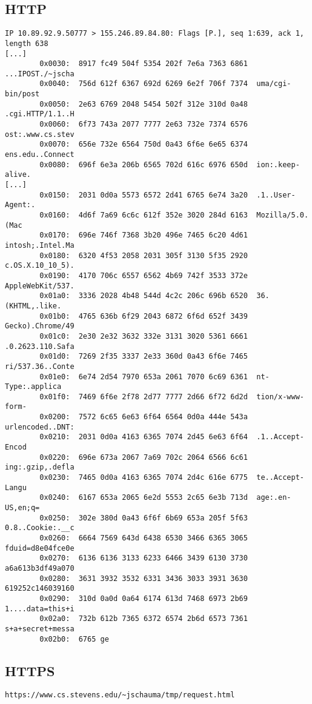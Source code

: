 \documentclass[xga]{xdvislides}
\begin{document}
\subsection{HTTP}
\small
\begin{verbatim}
IP 10.89.92.9.50777 > 155.246.89.84.80: Flags [P.], seq 1:639, ack 1, length 638
[...]
        0x0030:  8917 fc49 504f 5354 202f 7e6a 7363 6861  ...IPOST./~jscha
        0x0040:  756d 612f 6367 692d 6269 6e2f 706f 7374  uma/cgi-bin/post
        0x0050:  2e63 6769 2048 5454 502f 312e 310d 0a48  .cgi.HTTP/1.1..H
        0x0060:  6f73 743a 2077 7777 2e63 732e 7374 6576  ost:.www.cs.stev
        0x0070:  656e 732e 6564 750d 0a43 6f6e 6e65 6374  ens.edu..Connect
        0x0080:  696f 6e3a 206b 6565 702d 616c 6976 650d  ion:.keep-alive.
[...]
        0x0150:  2031 0d0a 5573 6572 2d41 6765 6e74 3a20  .1..User-Agent:.
        0x0160:  4d6f 7a69 6c6c 612f 352e 3020 284d 6163  Mozilla/5.0.(Mac
        0x0170:  696e 746f 7368 3b20 496e 7465 6c20 4d61  intosh;.Intel.Ma
        0x0180:  6320 4f53 2058 2031 305f 3130 5f35 2920  c.OS.X.10_10_5).
        0x0190:  4170 706c 6557 6562 4b69 742f 3533 372e  AppleWebKit/537.
        0x01a0:  3336 2028 4b48 544d 4c2c 206c 696b 6520  36.(KHTML,.like.
        0x01b0:  4765 636b 6f29 2043 6872 6f6d 652f 3439  Gecko).Chrome/49
        0x01c0:  2e30 2e32 3632 332e 3131 3020 5361 6661  .0.2623.110.Safa
        0x01d0:  7269 2f35 3337 2e33 360d 0a43 6f6e 7465  ri/537.36..Conte
        0x01e0:  6e74 2d54 7970 653a 2061 7070 6c69 6361  nt-Type:.applica
        0x01f0:  7469 6f6e 2f78 2d77 7777 2d66 6f72 6d2d  tion/x-www-form-
        0x0200:  7572 6c65 6e63 6f64 6564 0d0a 444e 543a  urlencoded..DNT:
        0x0210:  2031 0d0a 4163 6365 7074 2d45 6e63 6f64  .1..Accept-Encod
        0x0220:  696e 673a 2067 7a69 702c 2064 6566 6c61  ing:.gzip,.defla
        0x0230:  7465 0d0a 4163 6365 7074 2d4c 616e 6775  te..Accept-Langu
        0x0240:  6167 653a 2065 6e2d 5553 2c65 6e3b 713d  age:.en-US,en;q=
        0x0250:  302e 380d 0a43 6f6f 6b69 653a 205f 5f63  0.8..Cookie:.__c
        0x0260:  6664 7569 643d 6438 6530 3466 6365 3065  fduid=d8e04fce0e
        0x0270:  6136 6136 3133 6233 6466 3439 6130 3730  a6a613b3df49a070
        0x0280:  3631 3932 3532 6331 3436 3033 3931 3630  619252c146039160
        0x0290:  310d 0a0d 0a64 6174 613d 7468 6973 2b69  1....data=this+i
        0x02a0:  732b 612b 7365 6372 6574 2b6d 6573 7361  s+a+secret+messa
        0x02b0:  6765 ge
\end{verbatim}
\Normalsize


\subsection{HTTPS}
\begin{verbatim}
https://www.cs.stevens.edu/~jschauma/tmp/request.html
\end{verbatim}
\end{document}
